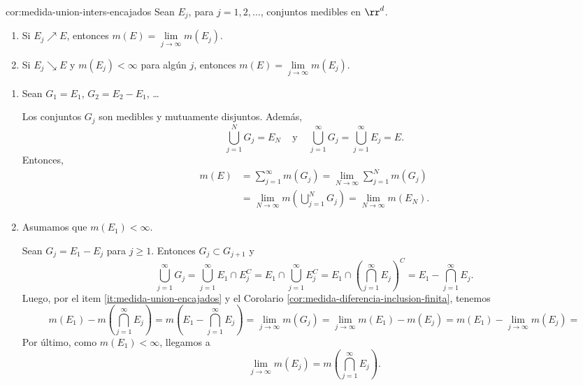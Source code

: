 \begin{corolario}{cor:medida-union-inters-encajados}
Sean $E_j$, para $j=1,2,\ldots$, conjuntos medibles en $\rr^d$. 
\begin{enumerate}
    \item \label{it:medida-union-encajados} Si $E_j\nearrow E$, entonces $m(E)=\lim\limits_{j \to \infty} m(E_j)$.
    \item \label{it:medida-interseccion-encajados} Si $E_j \searrow E$ y $m(E_j)<\infty$ para alg\'un $j$, entonces $m(E)=\lim\limits_{j \to \infty} m(E_j)$.
\end{enumerate}
\end{corolario}

\begin{demo}{}
\begin{enumerate}
    \item Sean $G_1=E_1$,\; $G_2=E_2-E_1$, \ldots
    
    Los conjuntos $G_j$ son medibles y mutuamente disjuntos. Adem\'as, 
    \[
    \bigcup\limits_{j=1}^{N}G_j =E_N\;\;\;
    \mbox{ y }\;\;\;
    \bigcup\limits_{j=1}^{\infty}G_j 
    =\bigcup\limits_{j=1}^{\infty} E_j=E.
    \]
    Entonces, 
    \[\begin{split}
    m(E)&=\sum\limits_{j=1}^{\infty}m(G_j)=
    \lim\limits_{N \to \infty} \sum\limits_{j=1}^N m(G_j)\\
    &=
    \lim\limits_{N \to \infty} m\left(\bigcup\limits_{j=1}^N G_j\right)=\lim\limits_{N\to \infty}m(E_N).
    \end{split}
    \]
    \item Asumamos que $m(E_1)<\infty$.
    
    Sean $G_j=E_{1}-E_j$ para $j\geq 1$. Entonces 
    $G_j \subset G_{j+1}$ y 
    \[
    \bigcup\limits_{j=1}^{\infty} G_j=
    \bigcup\limits_{j=1}^{\infty} E_{1}\cap E_j^C=
    E_1 \cap \bigcup\limits_{j=1}^{\infty} E_j^C=
    E_1 \cap\left( \bigcap\limits_{j=1}^{\infty} E_j \right)^C=
    E_1 -  \bigcap\limits_{j=1}^{\infty} E_j.
    \]
    Luego, por el item \ref{it:medida-union-encajados} y el Corolario \ref{cor:medida-diferencia-inclusion-finita}, tenemos
    \[
   m(E_1) - m( \bigcap\limits_{j=1}^{\infty} E_j)= m(E_1 -  \bigcap\limits_{j=1}^{\infty} E_j)=
    \lim\limits_{j \to \infty} m(G_j)=\lim\limits_{j \to \infty} m(E_1)-m(E_j)=
      m(E_1)-\lim\limits_{j \to \infty}m(E_j)=\]
     Por \'ultimo, como $m(E_1)<\infty$, llegamos a
     \[
     \lim\limits_{j \to \infty} m(E_j)=m\left(\bigcap\limits_{j=1}^{\infty} E_j\right).
     \]
\end{enumerate}
\end{demo}

